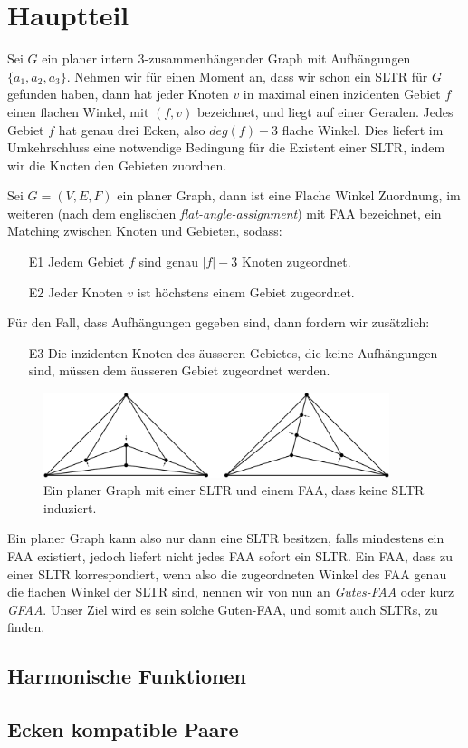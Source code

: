 \chapter{Hauptteil}

Sei $G$ ein planer intern 3-zusammenhängender Graph mit Aufhängungen $\{a_1,a_2,a_3\}$. Nehmen wir für einen Moment an, dass wir schon ein SLTR für $G$ gefunden haben, dann hat jeder Knoten $v$ in maximal einen inzidenten Gebiet $f$ einen flachen Winkel, mit $(f,v)$ bezeichnet, und liegt auf einer Geraden. Jedes Gebiet $f$ hat genau drei Ecken, also $deg(f)-3$ flache Winkel. Dies liefert im Umkehrschluss eine notwendige Bedingung für die Existent einer SLTR, indem wir die Knoten den Gebieten zuordnen.

\begin{definition}[FAA]
Sei $G=(V,E,F)$ ein planer Graph, dann ist eine Flache Winkel Zuordnung, im weiteren (nach dem englischen \textit{flat-angle-assignment}) mit FAA bezeichnet, ein Matching zwischen Knoten und Gebieten, sodass:
\begin{itemize}
\item [E1] Jedem Gebiet $f$ sind genau $|f|-3$ Knoten zugeordnet.
\item [E2] Jeder Knoten $v$ ist höchstens einem Gebiet zugeordnet.
\end{itemize}
Für den Fall, dass Aufhängungen gegeben sind, dann fordern wir zusätzlich:
\begin{itemize}
\item [E3] Die inzidenten Knoten des äusseren Gebietes, die keine Aufhängungen sind, müssen dem äusseren Gebiet zugeordnet werden.
\end{itemize}
\end{definition}

\begin{figure}[h]
	\centering
  \includegraphics[width=0.9\textwidth]{faa_def.png}
  \caption{Ein planer Graph mit einer SLTR und einem FAA, dass keine SLTR induziert.}
\end{figure}

Ein planer Graph kann also nur dann eine SLTR besitzen, falls mindestens ein FAA existiert, jedoch liefert nicht jedes FAA sofort ein SLTR. Ein FAA, dass zu einer SLTR korrespondiert, wenn also die zugeordneten Winkel des FAA genau die flachen Winkel der SLTR sind, nennen wir von nun an \textit{Gutes-FAA} oder kurz \textit{GFAA}. Unser Ziel wird es sein solche Guten-FAA, und somit auch SLTRs, zu finden.

\section{Harmonische Funktionen}


\section{Ecken kompatible Paare}